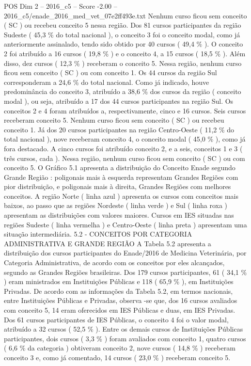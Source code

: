 \begin{textsample}{POS Dim 2 – 2016\_c5 – Score -2.00 – 2016\_c5/enade\_2016\_med\_vet\_07e2ff493e.txt}
Nenhum curso ficou sem conceito ( SC ) ou recebeu conceito 5 nessa região.
Dos 81 cursos participantes da região Sudeste ( 45,3 \% do total nacional ), o conceito 3 foi o conceito modal, como já anteriormente assinalado, tendo sido obtido por 40 cursos ( 49,4 \% ).
O conceito 2 foi atribuído a 16 cursos ( 19,8 \% ) e o conceito 4, a 15 cursos ( 18,5 \% ).
Além disso, dez cursos ( 12,3 \% ) receberam o conceito 5.
Nessa região, nenhum curso ficou sem conceito ( SC ) ou com conceito 1.
Os 44 cursos da região Sul corresponderam a 24,6 \% do total nacional.
Como já indicado, houve predominância do conceito 3, atribuído a 38,6 \% dos cursos da região ( conceito modal ), ou seja, atribuído a 17 dos 44 cursos participantes na região Sul.
Os conceitos 2 e 4 foram atribuídos a, respectivamente, cinco e 16 cursos.
Seis cursos receberam conceito 5.
Nenhum curso ficou sem conceito ( SC ) ou recebeu conceito 1.
Já dos 20 cursos participantes na região Centro-Oeste ( 11,2 \% do total nacional ), nove receberam conceito 4, o conceito modal ( 45,0 \% ), como já fora destacado.
A cinco cursos foi atribuído conceito 2, e a seis, conceitos 1 e 3 ( três cursos, cada ).
Nessa região, nenhum curso ficou sem conceito ( SC ) ou com conceito 5.
O Gráfico 5.1 apresenta a distribuição do Conceito Enade segundo Grande Região : poligonais mais à esquerda representam Grandes Regiões com pior distribuição, e poligonais mais à direita, Grandes Regiões com melhores conceitos.
A região Norte ( linha azul ) apresenta os cursos com conceitos mais baixos, ao passo que as regiões Nordeste ( linha verde ) e Sul ( linha roxa ) apresentam as distribuições com valores maiores.
Cursos em IES situadas nas regiões Sudeste ( linha vermelha ) e Centro-Oeste ( linha preta ) apresentam uma situação intermediária. 5.2 - CONCEITOS POR CATEGORIA ADMINISTRATIVA E GRANDE REGIÃO A Tabela 5.2 apresenta a distribuição dos cursos participantes do Enade/2016 de Medicina Veterinária, por Categoria Administrativa, de acordo com os conceitos por eles alcançados, segundo as Grandes Regiões brasileiras.
Dos 179 cursos participantes, 61 ( 34,1 \% ) eram ministrados em Instituições Públicas e 118 ( 65,9 \% ), em Instituições Privadas.
De acordo com as informações da Tabela 5.2, em termos nacionais, entre Instituições Públicas e Privadas, observa -se que, dos 16 cursos avaliados com conceito 5, 14 eram oferecidos em IES Públicas e duas, em IES Privadas.
Dos 61 cursos participantes de IES Públicas, o conceito 4 foi o valor modal, atribuído a 32 cursos ( 52,5 \% ).
Entre os demais cursos de Instituições Públicas participantes, dois cursos ( 3,3 \% ) foram avaliados com conceito 1, quatro cursos ( 6,6 \% da categoria ) obtiveram conceito 2, nove cursos ( 14,8 \% ) receberam conceito 3 e, como já comentado, 14 cursos ( 23,0 \% ) receberam conceito 5.

\end{textsample}

